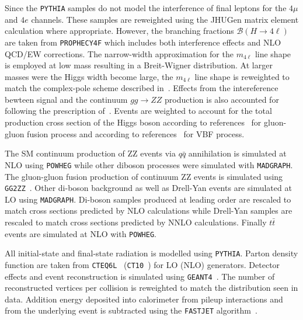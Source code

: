 Since the \verb+PYTHIA+ samples do not model the interference
of final leptons for the $4\mu$ and $4e$ channels.  These samples
are reweighted using the JHUGen matrix element calculation where
appropriate.  However, the branching fractions 
$\mathscr{B}(H\to 4\ell)$ are taken from \verb+PROPHECY4F+ which 
includes both interference effects and NLO QCD/EW corrections. 
The narrow-width approximation for the $m_{4\ell}$
line shape is employed at low mass resulting in a Breit-Wigner
distribution.  At larger masses were the Higgs width become large,
the $m_{4\ell}$ line shape is reweighted to match the complex-pole
scheme described in~\cite{Passarino:2010qk,Goria:2011wa,Kauer:2013cga}.  Effects from the intereference
bewteen signal and the continuum $gg\to ZZ$ production is also 
accounted for following the prescription of~\cite{Passarino:2012ri}.
Events are weighted to account for the total production cross
section of the Higgs boson according to 
references~\cite{Anastasiou:2008tj,deFlorian:2009hc,Baglio:2010ae,Dittmaier:2011ti,Djouadi:1991tka,Dawson:1990zj,Spira:1995rr,Harlander:2002wh,Anastasiou:2002yz,Ravindran:2003um,Catani:2003zt,Actis:2008ug} 
for gluon-gluon fusion process and according to 
references~\cite{Dittmaier:2011ti,Ciccolini:2007jr,Ciccolini:2007ec,Figy:2003nv,Arnold:2008rz,Bolzoni:2010xr} 
for VBF process.

The SM continuum production of ZZ events via $q\bar{q}$
annihilation is simulated at NLO using \verb+POWHEG+ while
other diboson processes were simulated with 
\verb+MADGRAPH+\cite{Alwall:2007st}.
The gluon-gluon
fusion production of continuum ZZ events is simulated using
\verb+GG2ZZ+~\cite{Binoth:2008pr}. Other di-boson background 
as well 
as Drell-Yan events  are simulated at LO using \verb+MADGRAPH+.  
Di-boson samples produced at leading order are rescaled to match
cross sections predicted by NLO calculations while Drell-Yan 
samples are rescaled to match cross sections predicted by NNLO
calculations.  Finally $t\bar{t}$ events are simulated at NLO
with \verb+POWHEG+.

All initial-state and final-state radiation is modelled using 
\verb+PYTHIA+. Parton density function are taken from 
\verb+CTEQ6L+~\cite{Lai:2010nw} (\verb+CT10+~\cite{Lai:2010vv}) 
for LO (NLO) 
generators.  Detector effects and event reconstruction is 
simulated using \verb+GEANT4+~\cite{Allison:2006ve}.  The number 
of reconstructed vertices per collision is reweighted to match 
the distribution seen in data.  Addition energy deposited into
calorimeter from pileup interactions and from the underlying
event is subtracted using the \verb+FASTJET+ algorithm~\cite{Cacciari:2007fd,Cacciari:2008gn,Cacciari:2011ma}. 

